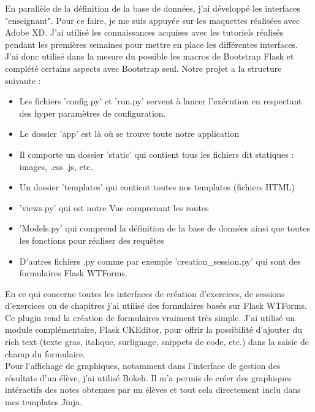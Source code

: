 \documentclass[12pt]{article}
\begin{document}
En parallèle de la définition de la base de données, j’ai développé les interfaces "enseignant". Pour ce faire, je me suis appuyée sur les maquettes réalisées avec Adobe XD. J’ai utilisé les connaissances acquises avec les tutoriels réalisés pendant les premières semaines pour mettre en place les différentes interfaces. J’ai donc utilisé dans la mesure du possible les macros de Bootstrap Flask et complété certains aspects avec Bootstrap seul. 
Notre projet a la structure suivante :
\begin{itemize}
    \item Les fichiers 'config.py' et 'run.py' servent à lancer l'exécution en respectant des hyper paramètres de configuration.
    
    \item Le dossier 'app' est là où se trouve toute notre application
    
    \item Il comporte un dossier 'static' qui contient tous les fichiers dit statiques : images, .css .js, etc.
    
    \item  Un dossier 'templates' qui contient toutes nos templates (fichiers HTML)
    
    \item 'views.py' qui est notre Vue comprenant les routes
    
    \item 'Models.py' qui comprend la définition de la base de données ainsi que toutes les fonctions pour réaliser des requêtes
    
    \item D'autres fichiers .py comme par exemple 'creation\_session.py' qui sont des formulaires Flask WTForms.

\end{itemize}

En ce qui concerne toutes les interfaces de création d’exercices, de sessions d’exercices ou de chapitres j’ai utilisé des formulaires basés sur Flask WTForms. Ce plugin rend la création de formulaires vraiment très simple. J'ai utilisé un module complémentaire, Flask CKEditor, pour offrir la possibilité d'ajouter du rich text (texte gras, italique, surlignage, snippets de code, etc.) dans la saisie de champ du formulaire. \\ 


Pour l'affichage de graphiques, notamment dans l'interface de gestion des résultats d'un élève, j'ai utilisé Bokeh. Il m'a permis de créer des graphiques intéractifs des notes obtenues par un élèves et tout cela directement inclu dans mes templates Jinja. \\
\end{document}
